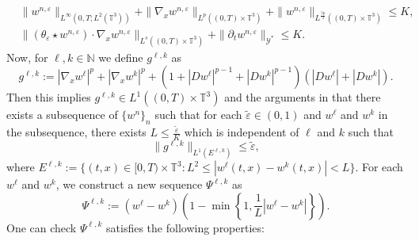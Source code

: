 \documentclass[10pt,reqno]{amsart}
\numberwithin{equation}{section}
\newcommand{\N}{\mathbb N}
\newcommand{\T}{\mathbb T}
\newcommand{\e}{\varepsilon}
\newcommand{\te}{\tilde\varepsilon}
\newcommand{\lt}{\left}
\newcommand{\rt}{\right}
\newcommand{\pa}{\partial}
\begin{document}
\[
\begin{aligned}
&\|w^{n,\e}\|_{L^\infty(0,T;L^2(\T^3))} + \|\nabla_x w^{n,\e}\|_{L^p((0,T)\times\T^3)} + \|w^{n,\e}\|_{L^{\frac{5p}{3}}((0,T)\times\T^3)} \le K,\\
&\|(\theta_\e \star w^{n,\e})\cdot\nabla_x w^{n,\e}\|_{L^s((0,T)\times\T^3)} + \|\pa_t w^{n,\e}\|_{\mathcal{Y}^*} \le K.
\end{aligned}
\]
Now, for $\ell, k \in \N$ we define $g^{\ell,k}$ as 
\[
g^{\ell,k} := |\nabla_x w^\ell|^p + |\nabla_x w^k|^p + (1+ |Dw^\ell|^{p-1} + |Dw^k|^{p-1})(|Dw^\ell| + |Dw^k|).
\]
Then this implies $g^{\ell,k} \in L^1((0,T)\times\T^3)$ and the arguments in \cite[Section 3]{FMS97} that there exists a subsequence  of $\{w^n\}_n$ such that for each $\te\in(0,1)$ and $w^\ell$ and $w^k$ in the subsequence, there exists $L \le \frac{\te}{K}$ which is independent of $\ell$ and $k$ such that
\[
\|g^{\ell,k}\|_{L^1(E^{\ell, k})} \le \te,
\]
where $E^{\ell,k} := \{ (t,x) \in [0,T)\times\T^3 : L^2 \le |w^\ell(t,x) - w^k(t,x)| <L \}$. For each $w^\ell$ and $w^k$, we construct a new sequence $\Psi^{\ell,k}$ as
\[
\Psi^{\ell, k} := (w^\ell - w^k) \lt(1- \min\lt\{1, \frac1L |w^\ell - w^k| \rt\} \rt).
\]
One can check $\Psi^{\ell,k}$ satisfies the following properties:
\end{document}
